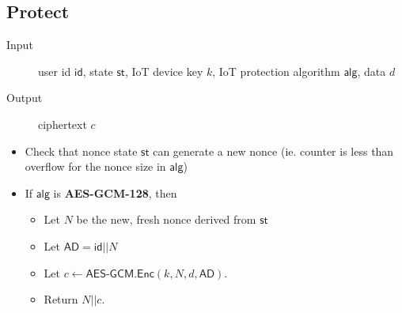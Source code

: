 \documentclass[10pt,a4paper]{article}
\newcommand{\id}{\ensuremath{\mathsf{id}}}
\newcommand{\alg}{\ensuremath{\mathsf{alg}}}
\newcommand{\AlgAESGCM}{\textsf{\textbf{AES-GCM-128}}}
\newcommand{\AESGCM}{\ensuremath{\textsf{AES-GCM}}}
\newcommand{\Encrypt}{\ensuremath{\textsf{Enc}}}
\begin{document}
\subsection{Protect}
\begin{description}
	\item[Input] user id $\id$, state $\mathsf{st}$, IoT device key $k$, IoT protection algorithm $\alg$, data $d$
	\item[Output] ciphertext $c$
\end{description}
\begin{itemize}
	\item Check that nonce state $\mathsf{st}$ can generate a new nonce (ie. counter is less than overflow for the nonce size in $\alg$)
	\item If $\alg$ is \AlgAESGCM, then
	\begin{itemize}
		\item Let $N$ be the new, fresh nonce derived from $\mathsf{st}$
		\item Let $\mathsf{AD} = \id||N$
		\item Let $c \gets \AESGCM.\Encrypt(k,N,d,\mathsf{AD})$.
		\item Return $N||c$.
	\end{itemize}
\end{itemize}
\end{document}
